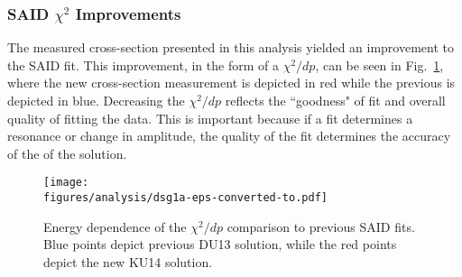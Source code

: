 \FloatBarrier
\subsubsection{SAID $\chi^2$ Improvements}\label{sec:chi}
The measured cross-section presented in this analysis yielded an improvement to the SAID fit. This improvement, in the form of a $\chi^2/dp$, can be seen in Fig.~\ref{fig:chi_sq}, where the new cross-section measurement is depicted in red while the previous is depicted in blue. Decreasing the $\chi^2/dp$ reflects the ``goodness" of fit and overall quality of fitting the data. This is important because if a fit determines a resonance or change in amplitude, the quality of the fit determines the accuracy of the of the solution.  
\begin{figure}[h!]\begin{center}
\texttt{[image: \\figures/analysis/dsg1a-eps-converted-to.pdf]}
\caption[Energy dependence of the $\chi^2/dp$ comparison to previous SAID fits]{\label{fig:chi_sq}Energy dependence of the $\chi^2/dp$ comparison to previous SAID fits. Blue points depict previous DU13 solution, while the red points depict the new KU14 solution.}
\end{center}\end{figure} 
\FloatBarrier
%
%
